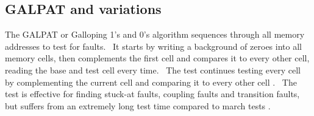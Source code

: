 \subsection{GALPAT and variations}
The GALPAT or Galloping 1’s and 0’s algorithm sequences through all memory addresses to test for faults.  It starts by writing a background of zeroes into all memory cells, then complements the first cell and compares it to every other cell, reading the base and test cell every time.  The test continues testing every cell by complementing the current cell and comparing it to every other cell \cite{oldref-09}.  The test is effective for finding stuck-at faults, coupling faults and transition faults, but suffers from an extremely long test time compared to march tests \cite{1327984}.  

